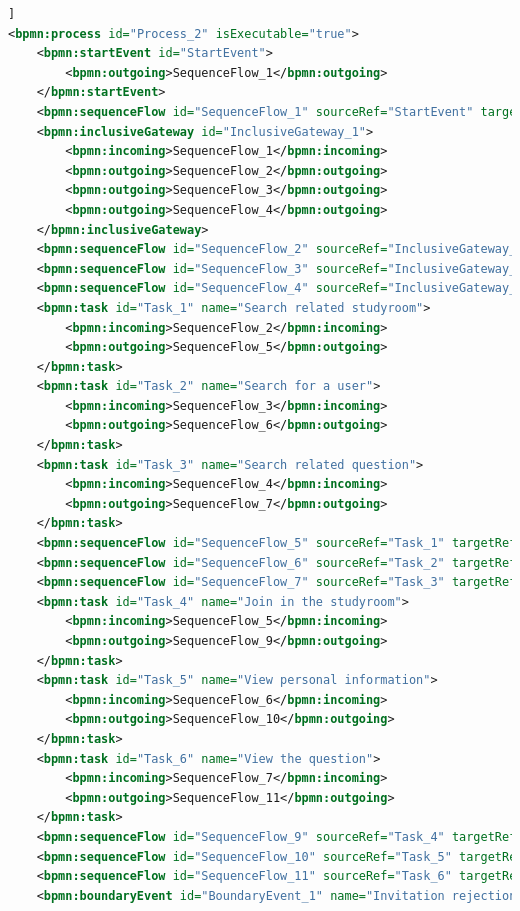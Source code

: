 \documentclass[runningheads]{llncs}
\begin{document}
\begin{lstlisting}[language={XML}]]
<bpmn:process id="Process_2" isExecutable="true">
	<bpmn:startEvent id="StartEvent">
        <bpmn:outgoing>SequenceFlow_1</bpmn:outgoing>
    </bpmn:startEvent>
    <bpmn:sequenceFlow id="SequenceFlow_1" sourceRef="StartEvent" targetRef="InclusiveGateway_1" />
    <bpmn:inclusiveGateway id="InclusiveGateway_1">
        <bpmn:incoming>SequenceFlow_1</bpmn:incoming>
        <bpmn:outgoing>SequenceFlow_2</bpmn:outgoing>
        <bpmn:outgoing>SequenceFlow_3</bpmn:outgoing>
        <bpmn:outgoing>SequenceFlow_4</bpmn:outgoing>
    </bpmn:inclusiveGateway>
    <bpmn:sequenceFlow id="SequenceFlow_2" sourceRef="InclusiveGateway_1" targetRef="Task_1" />
    <bpmn:sequenceFlow id="SequenceFlow_3" sourceRef="InclusiveGateway_1" targetRef="Task_2" />
    <bpmn:sequenceFlow id="SequenceFlow_4" sourceRef="InclusiveGateway_1" targetRef="Task_3" />
    <bpmn:task id="Task_1" name="Search related studyroom">
        <bpmn:incoming>SequenceFlow_2</bpmn:incoming>
        <bpmn:outgoing>SequenceFlow_5</bpmn:outgoing>
    </bpmn:task>
    <bpmn:task id="Task_2" name="Search for a user">
        <bpmn:incoming>SequenceFlow_3</bpmn:incoming>
        <bpmn:outgoing>SequenceFlow_6</bpmn:outgoing>
    </bpmn:task>
    <bpmn:task id="Task_3" name="Search related question">
        <bpmn:incoming>SequenceFlow_4</bpmn:incoming>
        <bpmn:outgoing>SequenceFlow_7</bpmn:outgoing>
    </bpmn:task>
    <bpmn:sequenceFlow id="SequenceFlow_5" sourceRef="Task_1" targetRef="Task_4" />
    <bpmn:sequenceFlow id="SequenceFlow_6" sourceRef="Task_2" targetRef="Task_5" />
    <bpmn:sequenceFlow id="SequenceFlow_7" sourceRef="Task_3" targetRef="Task_5" />
    <bpmn:task id="Task_4" name="Join in the studyroom">
        <bpmn:incoming>SequenceFlow_5</bpmn:incoming>
        <bpmn:outgoing>SequenceFlow_9</bpmn:outgoing>
    </bpmn:task>
    <bpmn:task id="Task_5" name="View personal information">
        <bpmn:incoming>SequenceFlow_6</bpmn:incoming>
        <bpmn:outgoing>SequenceFlow_10</bpmn:outgoing>
    </bpmn:task>
    <bpmn:task id="Task_6" name="View the question">
        <bpmn:incoming>SequenceFlow_7</bpmn:incoming>
        <bpmn:outgoing>SequenceFlow_11</bpmn:outgoing>
    </bpmn:task>
    <bpmn:sequenceFlow id="SequenceFlow_9" sourceRef="Task_4" targetRef="EndEvent_3" />
    <bpmn:sequenceFlow id="SequenceFlow_10" sourceRef="Task_5" targetRef="Task_7" />
    <bpmn:sequenceFlow id="SequenceFlow_11" sourceRef="Task_6" targetRef="InclusiveGateway_2" />
    <bpmn:boundaryEvent id="BoundaryEvent_1" name="Invitation rejection" attachedToRef="Task_4">

\end{lstlisting}
\end{document}
